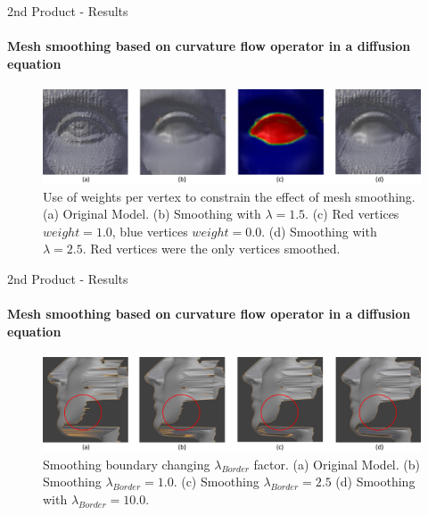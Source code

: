 \documentclass[10pt, compress, english]{beamer}
\begin{document}
\begin{frame}{2nd Product - Results}


\framesubtitle{Mesh smoothing based on curvature flow operator in a diffusion equation}


\begin{figure}[H]
\noindent \begin{centering}
\includegraphics[width=1\textwidth]{img/LaplacianSmoothingVertecGroup}
\par\end{centering}

\protect\caption{Use of weights per vertex to constrain the effect of mesh smoothing.
(a) Original Model. (b) Smoothing with $\lambda=1.5$. (c) Red vertices
$weight=1.0$, blue vertices $weight=0.0$. (d) Smoothing with $\lambda=2.5$.
 Red vertices were the only vertices smoothed.}
\end{figure}


\end{frame}



\begin{frame}{2nd Product - Results}


\framesubtitle{Mesh smoothing based on curvature flow operator in a diffusion equation}


\begin{figure}[H]
\noindent \begin{centering}
\includegraphics[width=1\textwidth]{img/LaplacianSmoothingBoundary}
\par\end{centering}

\protect\caption{Smoothing boundary changing $\lambda_{Border}$ factor. (a) Original
Model. (b) Smoothing $\lambda_{Border}=1.0$. (c) Smoothing $\lambda_{Border}=2.5$
(d) Smoothing with $\lambda_{Border}=10.0$. }
\end{figure}
 

\end{frame}
 
\end{document}
